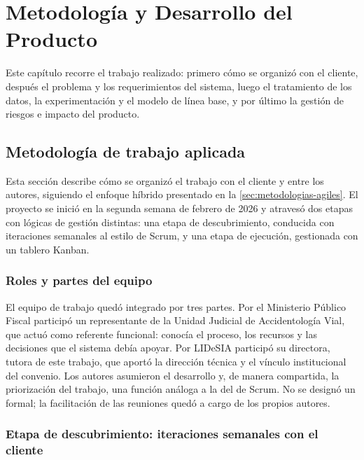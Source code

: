 \chapter{Metodología y Desarrollo del Producto}\label{desarrollo-del-producto}

Este capítulo recorre el trabajo realizado: primero cómo se organizó con el cliente, después el problema y los requerimientos del sistema, luego el tratamiento de los datos, la experimentación y el modelo de línea base, y por último la gestión de riesgos e impacto del producto.

\section{Metodología de trabajo aplicada}\label{sec:metodologia-aplicada}

Esta sección describe cómo se organizó el trabajo con el cliente y entre los autores, siguiendo el enfoque híbrido presentado en la \cref{sec:metodologias-agiles}. El proyecto se inició en la segunda semana de febrero de 2026 y atravesó dos etapas con lógicas de gestión distintas: una etapa de descubrimiento, conducida con iteraciones semanales al estilo de Scrum, y una etapa de ejecución, gestionada con un tablero Kanban.

\subsection{Roles y partes del equipo}\label{ssec:roles}

El equipo de trabajo quedó integrado por tres partes. Por el Ministerio Público Fiscal participó un representante de la Unidad Judicial de Accidentología Vial, que actuó como referente funcional: conocía el proceso, los recursos y las decisiones que el sistema debía apoyar. Por LIDeSIA participó su directora, tutora de este trabajo, que aportó la dirección técnica y el vínculo institucional del convenio. Los autores asumieron el desarrollo y, de manera compartida, la priorización del trabajo, una función análoga a la del  de Scrum. No se designó un  formal; la facilitación de las reuniones quedó a cargo de los propios autores.

\subsection{Etapa de descubrimiento: iteraciones semanales con el cliente}\label{ssec:descubrimiento}


